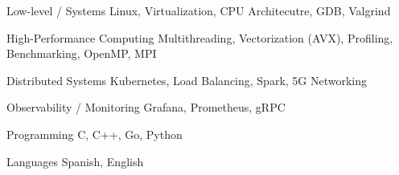 

\begin{cvskills}
  \cvskill
    {Low-level / Systems} %
    {Linux, Virtualization, CPU Architecutre, GDB, Valgrind}  %

  \cvskill
    {High-Performance Computing}
    {Multithreading, Vectorization (AVX), Profiling, Benchmarking, OpenMP, MPI} %

  \cvskill
    {Distributed Systems} %
    {Kubernetes, Load Balancing, Spark, 5G Networking} %

  \cvskill
    {Observability / Monitoring} %
    {Grafana, Prometheus, gRPC} %

  \cvskill
    {Programming} %
    {C, C++, Go, Python} %

  \cvskill
    {Languages} %
    {Spanish, English} %

\end{cvskills}
